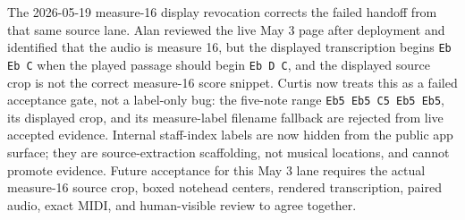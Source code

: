 \documentclass[12pt,letterpaper]{article}
\begin{document}
The 2026-05-19 measure-16 display revocation corrects the failed handoff from that same source lane. Alan reviewed the live May 3 page after deployment and identified that the audio is measure 16, but the displayed transcription begins \texttt{Eb Eb C} when the played passage should begin \texttt{Eb D C}, and the displayed source crop is not the correct measure-16 score snippet. Curtis now treats this as a failed acceptance gate, not a label-only bug: the five-note range \texttt{Eb5 Eb5 C5 Eb5 Eb5}, its displayed crop, and its measure-label filename fallback are rejected from live accepted evidence. Internal staff-index labels are now hidden from the public app surface; they are source-extraction scaffolding, not musical locations, and cannot promote evidence. Future acceptance for this May 3 lane requires the actual measure-16 source crop, boxed notehead centers, rendered transcription, paired audio, exact MIDI, and human-visible review to agree together.
\end{document}
